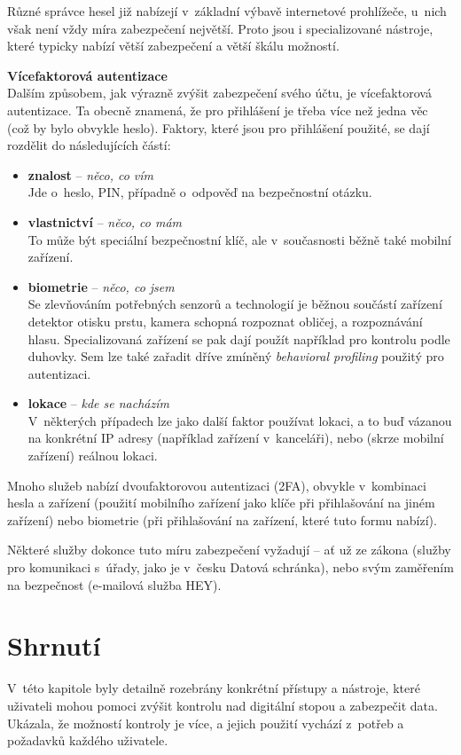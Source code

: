 Různé správce hesel již nabízejí v~základní výbavě internetové prohlížeče, u~nich však není vždy míra zabezpečení největší. Proto jsou i specializované nástroje, které typicky nabízí větší zabezpečení a větší škálu možností.

\textbf{Vícefaktorová autentizace}\\
Dalším způsobem, jak výrazně zvýšit zabezpečení svého účtu, je vícefaktorová autentizace. Ta obecně znamená, že pro přihlášení je třeba více než jedna věc (což by bylo obvykle heslo). Faktory, které jsou pro přihlášení použité, se dají rozdělit do následujících částí:

\begin{itemize}
	\item \textbf{znalost} -- \textit{něco, co vím}\\ 
		Jde o~heslo, PIN, případně o~odpověď na bezpečnostní otázku.
	\item \textbf{vlastnictví} -- \textit{něco, co mám}\\
		To může být speciální bezpečnostní klíč, ale v~současnosti běžně také mobilní zařízení. 
	\item \textbf{biometrie} -- \textit{něco, co jsem}\\
		Se zlevňováním potřebných senzorů a technologií je běžnou součástí zařízení detektor otisku prstu, kamera schopná rozpoznat obličej, a rozpoznávání hlasu. Specializovaná zařízení se pak dají použít například pro kontrolu podle duhovky. Sem lze také zařadit dříve zmíněný \textit{behavioral profiling} použitý pro autentizaci.
	\item \textbf{lokace} -- \textit{kde se nacházím}\\
		V~některých případech lze jako další faktor používat lokaci, a to buď vázanou na konkrétní IP adresy (například zařízení v~kanceláři), nebo (skrze mobilní zařízení) reálnou lokaci.  
\end{itemize} 

Mnoho služeb nabízí dvoufaktorovou autentizaci (2FA), obvykle v~kombinaci hesla a zařízení (použití mobilního zařízení jako klíče při přihlašování na jiném zařízení) nebo biometrie (při přihlašování na zařízení, které tuto formu nabízí).

Některé služby dokonce tuto míru zabezpečení vyžadují -- ať už ze zákona (služby pro komunikaci s~úřady, jako je v~česku Datová schránka), nebo svým zaměřením na  bezpečnost (e-mailová služba HEY).


\section*{Shrnutí}
V~této kapitole byly detailně rozebrány konkrétní přístupy a nástroje, které uživateli mohou pomoci zvýšit kontrolu nad digitální stopou a zabezpečit data.
Ukázala, že možností kontroly je více, a jejich použití vychází z~potřeb a požadavků každého uživatele.